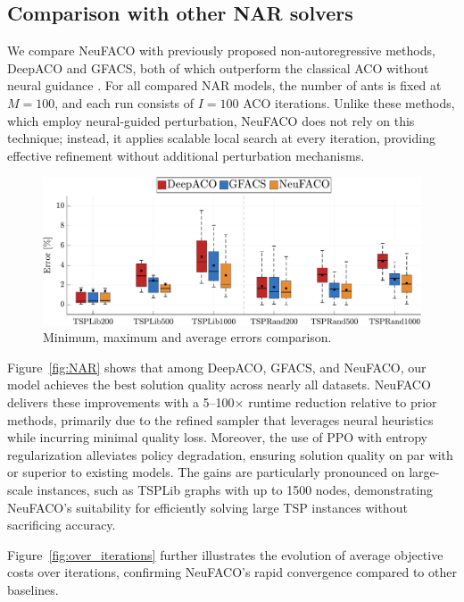 \documentclass[a4paper,conference]{IEEEtran}
\begin{document}
\subsection{Comparison with other NAR solvers}
We compare NeuFACO with previously proposed non-autoregressive methods, DeepACO and GFACS, both of which outperform the classical ACO without neural guidance \cite{DeepACO,GFACS}. For all compared NAR models, the number of ants is fixed at $M=100$, and each run consists of $I=100$ ACO iterations. Unlike these methods, which employ neural-guided perturbation, NeuFACO does not rely on this technique; instead, it applies scalable local search at every iteration, providing effective refinement without additional perturbation mechanisms.

\begin{figure}[h]
  \centering
  \includegraphics[width=\linewidth]{TSPOverview.pdf}
  \caption{Minimum, maximum and average errors comparison.}
  \label{fig:candle}
\end{figure}

Figure~\ref{fig:NAR} shows that among DeepACO, GFACS, and NeuFACO, our model achieves the best solution quality across nearly all datasets. NeuFACO delivers these improvements with a 5--100$\times$ runtime reduction relative to prior methods, primarily due to the refined sampler that leverages neural heuristics while incurring minimal quality loss. Moreover, the use of PPO with entropy regularization alleviates policy degradation, ensuring solution quality on par with or superior to existing models. The gains are particularly pronounced on large-scale instances, such as TSPLib graphs with up to 1500 nodes, demonstrating NeuFACO’s suitability for efficiently solving large TSP instances without sacrificing accuracy.

Figure~\ref{fig:over_iterations} further illustrates the evolution of average objective costs over iterations, confirming NeuFACO’s rapid convergence compared to other baselines.
\end{document}
